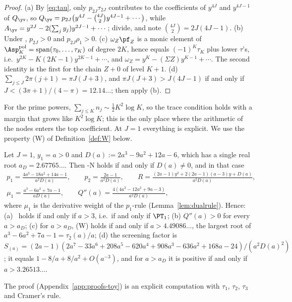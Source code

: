 \begin{proof}
(a) By \eqref{eq:tau}, only $p_{2J}\tau_{2J}$ contributes to the coefficients of $y^{4J}$ and $y^{4J-1}$ of $Q_{\yv}$, so
$Q_{\yv}=p_{2J}\bigl(y^{4J}-\binom{4J}2y^{4J-1}+\cdots\bigr)$, while $A_{\yv}=y^{2J}-2(\sum_jy_j)y^{2J-1}+\cdots$;
divide, and note $\binom{4J}{2}=2J(4J-1)$. (b) Under \Rp, $p_{2J}>0$ and $p_{2J}\rho_1>0$. (c) $\omega_Z\pf_Z$ is a monic
element of $\Asp^{\mathrm{pol}}_K=\operatorname{span}(\tau_0,\dots,\tau_K)$ of degree $2K$, hence equals
$(-1)^K\tau_K$ plus lower $\tau$'s, i.e.\ $y^{2K}-K(2K-1)y^{2K-1}+\cdots$, and $\omega_Z=y^K-(\Sigma Z)y^{K-1}+\cdots$. The
second identity is the first for the chain $Z+0$ of level $K+1$. (d) $\sum_{j\le J}2\pi(j+1)=\pi J(J+3)$, and
$\pi J(J+3)>J(4J-1)$ if and only if $J<(3\pi+1)/(4-\pi)=12.14\ldots$; then apply (b).
\end{proof}

For the prime powers, $\sum_{j\le K}n_j\sim\frac12K^2\log K$, so the trace condition holds with a margin that grows
like $K^2\log K$; this is the only place where the arithmetic of the nodes enters the top coefficient. At $J=1$
everything is explicit. We use the property \textup{(W)} of Definition~\ref{def:W} below.

\begin{proposition}\label{prop:J1}
Let $J=1$, $y_1=a>0$ and $D(a):=2a^3-9a^2+12a-6$, which has a single real root $a_D=2.67765\ldots$. Then
\hyp{N} holds if and only if $D(a)\neq0$, and in that case
\begin{gather*}
  p_1=\frac{4a^3-18a^2+14a-1}{a^2D(a)},\qquad p_2=\frac{2a-1}{a^2D(a)},\qquad
  R=\frac{(2a-1)y^2+2(2a-1)(a-3)y+D(a)}{a^2D(a)},\\
  \mu_1=\frac{a^3-6a^2+7a-1}{aD(a)},\qquad Q''(a)=\frac{4(4a^3-12a^2+9a-3)}{a^2D(a)},
\end{gather*}
where $\mu_1$ is the derivative weight of the $p_1$-rule (Lemma~\ref{lem:dualrule}). Hence:
\textup{(a)} \Rp\ holds if and only if $a>3$, i.e.\ if and only if $\PT_1$;
\textup{(b)} $Q''(a)>0$ for every $a>a_D$;
\textup{(c)} for $a>a_D$, \textup{(W)} holds if and only if $a>4.49086\ldots$, the largest root of
$a^3-6a^2+7a-1=\tau_2(a)/a$;
\textup{(d)} the screening factor is
$S_{(a)}=(2a-1)(2a^7-33a^6+208a^5-620a^4+908a^3-636a^2+168a-24)/(a^2D(a)^2)$; it equals $1-8/a+8/a^2+O(a^{-3})$,
and for $a>a_D$ it is positive if and only if $a>3.26513\ldots$.
\end{proposition}

The proof (Appendix~\ref{app:proofs-toy}) is an explicit computation with $\tau_1$, $\tau_2$, $\tau_3$ and Cramer's rule.

